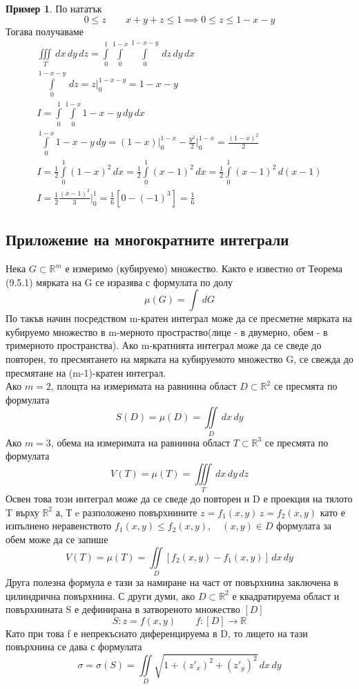 \documentclass[a4paper,fleqn,12pt]{article}
\theoremstyle{definition}
\newtheorem{example}{Пример}[subsection]
\begin{document}
\begin{example}
По нататък 
$$0 \leq z \qquad x+y+z \leq 1 \implies 0 \leq z \leq 1 - x - y$$
Тогава получаваме 
\begin{gather*}
\iiint\limits_T \, dx \, dy \, dz = \int\limits_0 ^1 \int\limits_0 ^{1-x} \int\limits_0 ^{1-x-y} \, dz \, dy \, dx  \\
\int\limits_0 ^{1-x-y} \, dz = z\Big|_0 ^{1-x-y} = 1-x-y \\
I =  \int\limits_0 ^1 \int\limits_0 ^{1-x} 1-x-y \, dy \, dx \\
\int\limits_0 ^{1-x} 1-x-y \, dy = (1-x) \Big|_0 ^{1-x} - \frac{y^2}{2}  \Big|_0 ^{1-x} = \frac{(1-x)^2}{2} \\
I = \frac{1}{2} \int\limits_0 ^1 (1-x)^2 \, dx =  \frac{1}{2} \int\limits_0 ^1 (x-1)^2 \, dx =   \frac{1}{2} \int\limits_0 ^1 (x-1)^2 \, d(x-1) \\
I = \frac{1}{2} \frac{(x-1)^3}{3} \Big|_0 ^1 = \frac{1}{6} [0 - (-1)^3] = \frac{1}{6}
\end{gather*}
\end{example}

\subsection{Приложение на многократните интеграли}
Нека $G \subset \mathbb{R}^m$ е измеримо (кубируемо) множество. Както е известно от Теорема (9.5.1) мярката на G се изразява с формулата по долу
$$\mu (G) = \int \, dG$$
По такъв начин посредством m-кратен интеграл може да се пресметне мярката на кубируемо множество в m-мерното простраство(лице - в двумерно, обем - в тримерното пространства). Ако m-кратнията интеграл може да се сведе до повторен, то пресмятането на мярката на кубируемото множество G, се свежда до пресмятане на (m-1)-кратен интеграл. \\
Ако $m=2$, площта на измеримата на равнинна област $D \subset \mathbb{R}^2$ се пресмята по формулата 
$$S(D) = \mu(D) = \iint\limits_D \, dx \, dy$$
Ако $m=3$, обема на измеримата на равнинна област $T \subset \mathbb{R}^3$ се пресмята по формулата 
$$V(T) = \mu(T) = \iiint\limits_T \, dx \, dy \, dz$$
Освен това този интеграл може да се сведе до повторен и D е проекция на тялото T върху $\mathbb{R}^2$ а, Т e разположено повърхнините $z = f_1(x,y) \, z = f_2 (x,y)$ като е изпълнено неравенството $ f_1(x,y) \leq f_2 (x,y), \quad (x,y) \in D$ формулата за обем може да се запише
$$V(T) = \mu(T) = \iint\limits_D \left[ f_2 (x,y) - f_1 (x,y)\right] \, dx \, dy$$
Друга полезна формула е тази за намиране на част от повърхнина заключена в цилиндрична повърхнина. С други думи, ако $D \subset \mathbb{R}^2$ е квадратируема област и повърхнината S е дефинирана в затвореното множество $[D]$
$$S: z = f(x,y) \qquad f:[D] \to \mathbb{R}$$
Като при това f е непрекъснато диференцируема в D, то лицето на тази повърхнина се дава с формулата
$$\sigma = \sigma(S) = \iint\limits_D \sqrt{1 + (z'_x)^2 + (z'_y)^2} \, dx \, dy$$
\end{document}
